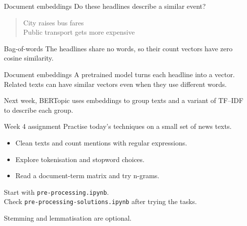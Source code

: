 \documentclass[compress]{beamer}
\begin{document}
\begin{frame}{Document embeddings}
Do these headlines describe a similar event?

\begin{quote}
	City raises bus fares\\
	Public transport gets more expensive
\end{quote}

\begin{block}{Bag-of-words}
	The headlines share no words, so their count vectors have zero cosine similarity.
\end{block}

\begin{block}{Document embeddings}
	A pretrained model turns each headline into a vector. Related texts can have similar vectors even when they use different words.
\end{block}

Next week, BERTopic uses embeddings to group texts and a variant of TF--IDF to describe each group.
\end{frame}
\begin{frame}{Week 4 assignment}
Practise today's techniques on a small set of news texts.

\begin{itemize}
	\item Clean texts and count mentions with regular expressions.
	\item Explore tokenisation and stopword choices.
	\item Read a document-term matrix and try n-grams.
\end{itemize}

\medskip
\href{https://github.com/uvacw/teaching-bdaca/tree/main/6ec-course/week04/exercises}{}

\medskip
{\small
Start with \texttt{pre-processing.ipynb}.\\
Check \texttt{pre-processing-solutions.ipynb} after trying the tasks.

\smallskip
Stemming and lemmatisation are optional.
}
\end{frame}
\end{document}
